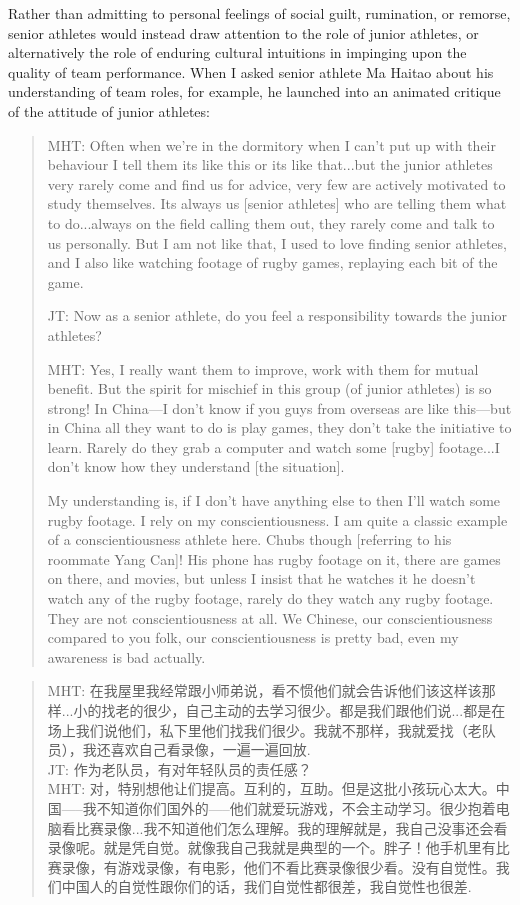 \begin{CJK}{UTF8}{gbsn}
Rather than admitting to personal feelings of social guilt, rumination, or remorse, senior athletes would instead draw attention to the role of junior athletes, or alternatively the role of enduring cultural intuitions in impinging upon the quality of team performance.  When I asked senior athlete Ma Haitao about his understanding of team roles, for example, he launched into an animated critique of the attitude of junior athletes:

  \begin{quote}
    MHT: Often when we're in the dormitory when I can't put up with their behaviour I tell them its like this or its like that...but the junior athletes very rarely come and find us for advice, very few are actively motivated to study themselves. Its always us [senior athletes] who are telling them what to do...always on the field calling them out, they rarely come and talk to us personally.  But I am not like that, I used to love finding senior athletes, and I also like watching footage of rugby games, replaying each bit of the game.

    JT: Now as a senior athlete, do you feel a responsibility towards the junior athletes?

    MHT: Yes, I really want them to improve, work with them for mutual benefit.  But the spirit for mischief in this group (of junior athletes) is so strong! In China---I don't know if you guys from overseas are like this---but in China all they want to do is play games, they don't take the initiative to learn.  Rarely do they grab a computer and watch some [rugby] footage...I don't know how they understand [the situation].

    My understanding is, if I don't have anything else to then I'll watch some rugby footage. I rely on my conscientiousness.  I am quite a classic example of a conscientiousness athlete here.  Chubs though [referring to his roommate Yang Can]!  His phone has rugby footage on it, there are games on there, and movies, but unless I insist that he watches it he doesn't watch any of the rugby footage, rarely do they watch any rugby footage.  They are not conscientiousness at all. We Chinese, our conscientiousness compared to you folk, our conscientiousness is pretty bad, even my awareness is bad actually.
  \end{quote}

  \begin{quote}
    MHT: 在我屋里我经常跟小师弟说，看不惯他们就会告诉他们该这样该那样...小的找老的很少，自己主动的去学习很少。都是我们跟他们说...都是在场上我们说他们，私下里他们找我们很少。我就不那样，我就爱找（老队员），我还喜欢自己看录像，一遍一遍回放. \\
    JT: 作为老队员，有对年轻队员的责任感？
    \\
    MHT: 对，特别想他让们提高。互利的，互助。但是这批小孩玩心太大。中国—--我不知道你们国外的—--他们就爱玩游戏，不会主动学习。很少抱着电脑看比赛录像...我不知道他们怎么理解。我的理解就是，我自己没事还会看录像呢。就是凭自觉。就像我自己我就是典型的一个。胖子！他手机里有比赛录像，有游戏录像，有电影，他们不看比赛录像很少看。没有自觉性。我们中国人的自觉性跟你们的话，我们自觉性都很差，我自觉性也很差.
  \end{quote}


\end{CJK}
